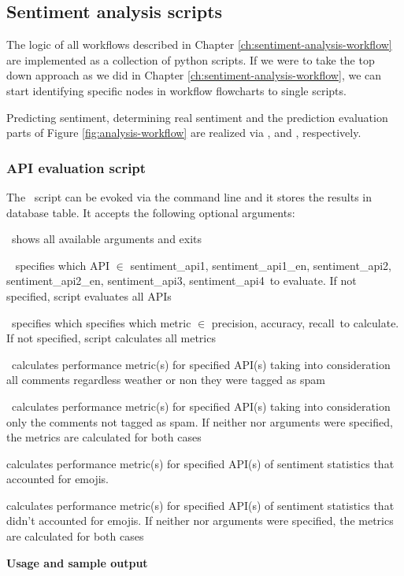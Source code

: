 \subsection{Sentiment analysis scripts\label{sec:sentiment-analysis-workflow}}

The logic of all workflows described in Chapter \ref{ch:sentiment-analysis-workflow} are implemented as a collection of python scripts.
If we were to take the top down approach as we did in Chapter \ref{ch:sentiment-analysis-workflow}, we can start identifying specific nodes in workflow flowcharts to single scripts.

Predicting sentiment, determining real sentiment and the prediction evaluation parts of Figure \ref{fig:analysis-workflow} are realized via 
\emph{}, 
\emph{} and 
\emph{}, respectively.

\subsubsection*{API evaluation script}
\noindent The \emph{}\ script can be evoked via the command line and it stores the results in  database table. It accepts the following optional arguments:

\begin{description}[labelindent=0.7cm, leftmargin=1.7cm]
\singlespacing
\item[--help ] shows all available arguments and exits
\item[--api \textless name\textgreater] 
	specifies which API $\in$ \lcb 
	sentiment\_api1, 
	sentiment\_api1\_en, 
	sentiment\_api2, 
	sentiment\_api2\_en, 
	sentiment\_api3, 
	sentiment\_api4\rcb\ to evaluate. If not specified, script evaluates all APIs 
\item[--metric \textless name\textgreater ] specifies which
	specifies which metric $\in$ \lcb
	precision, accuracy, recall\rcb\ to calculate. If not specified, script calculates all metrics
\item[--spam] calculates performance metric(s) for specified API(s) taking into consideration all comments regardless weather or non they were tagged as spam
\item[--no-spam] calculates performance metric(s) for specified API(s) taking into consideration only the comments not tagged as spam. 
If neither  nor  arguments were specified, the metrics are calculated for both cases
\item[--emoji] calculates performance metric(s) for specified API(s) of sentiment statistics that accounted for emojis. 
\item[--no-emoji] calculates performance metric(s) for specified API(s) of sentiment statistics that didn't accounted for emojis. 
If neither  nor  arguments were specified, the metrics are calculated for both cases
\end{description}
\textbf{Usage and sample output}


